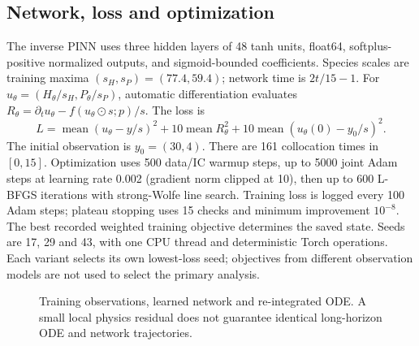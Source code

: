 \subsection{Network, loss and optimization}
The inverse PINN \cite{raissi2019} uses three hidden layers of 48 tanh units, float64,
softplus-positive normalized outputs, and sigmoid-bounded coefficients. Species scales
are training maxima $(s_H,s_P)=(77.4,59.4)$; network time is $2t/15-1$.
For $u_\theta=(H_\theta/s_H,P_\theta/s_P)$, automatic differentiation evaluates
$R_\theta=\partial_tu_\theta-f(u_\theta\odot s;p)/s$. The loss is
\[
L=\operatorname{mean}(u_\theta-y/s)^2+
10\operatorname{mean}R_\theta^2+
10\operatorname{mean}(u_\theta(0)-y_0/s)^2.
\]
The initial observation is $y_0=(30,4)$. There are 161 collocation times in $[0,15]$.
Optimization uses 500 data/IC warmup steps, up to 5000 joint Adam steps at learning rate
0.002 (gradient norm clipped at 10), then up to 600 L-BFGS iterations with strong-Wolfe
line search. Training loss is logged every 100 Adam steps; plateau stopping uses
15 checks and minimum improvement $10^{-8}$. The best recorded weighted training
objective determines the saved state. Seeds are 17, 29 and 43, with one CPU thread and
deterministic Torch operations. Each variant selects its own lowest-loss seed; objectives
from different observation models are not used to select the primary analysis.
\begin{figure}[htbp]\centering
{}
\caption{Training observations, learned network and re-integrated ODE. A small local
physics residual does not guarantee identical long-horizon ODE and network trajectories.}
\end{figure}

